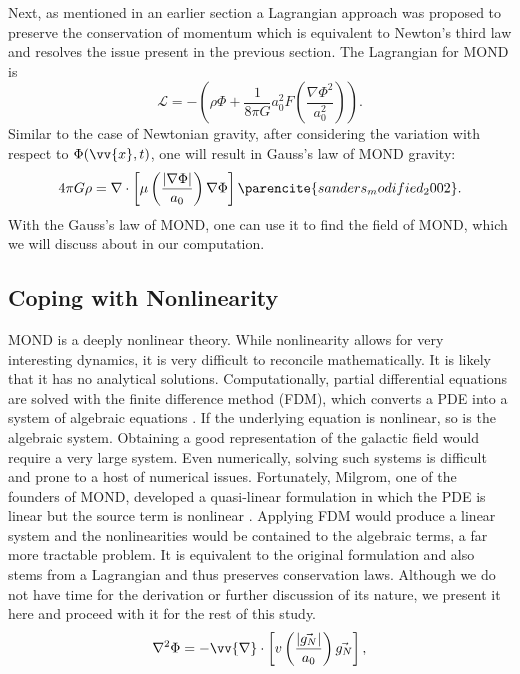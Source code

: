 \documentclass[11pt, twocolumn]{article}
\newcommand{\vx}{\vv{x}}
\newcommand{\ff}[2]{\frac{#1}{#2}}
\newcommand{\abs}[1]{| #1 |}
\renewcommand{\div}{\vv{\nabla} \cdot}
\begin{document}
    Next, as mentioned in an earlier section a Lagrangian approach was proposed to preserve the conservation of momentum which is equivalent to Newton's third law and resolves the issue present in the previous section. The Lagrangian for MOND is
    \begin{equation}
        \mathcal{L} = - \left(\rho \Phi + \ff{1}{8 \pi G}a_0^2F\left(\ff{\nabla \Phi^2}{a_0^2}\right)\right).
    \end{equation}
    Similar to the case of Newtonian gravity, after considering the variation with respect to \(\Phi(\vx, t)\), one will result in Gauss's law of MOND gravity:
    \begin{equation}
        4 \pi G \rho = \nabla \cdot \left[\mu \left(\ff{\abs{\nabla \Phi}}{a_0}\right)\nabla \Phi\right] \parencite{sanders_modified_2002}.
    \end{equation}
    With the Gauss's law of MOND, one can use it to find the field of MOND, which we will discuss about in our computation.



    \subsection*{Coping with Nonlinearity}
    MOND is a deeply nonlinear theory. While nonlinearity allows for very interesting dynamics, it is very difficult to reconcile mathematically. It is likely that it has no analytical solutions. Computationally, partial differential equations are solved with the finite difference method (FDM), which converts a PDE into a system of algebraic equations \parencite{sauer_numerical_2017}. If the underlying equation is nonlinear, so is the algebraic system. Obtaining a good representation of the galactic field would require a very large system. Even numerically, solving such systems is difficult and prone to a host of numerical issues. Fortunately, Milgrom, one of the founders of MOND, developed a quasi-linear formulation in which the PDE is linear but the source term is nonlinear \parencite{milgrom_quasi-linear_2010}. Applying FDM would produce a linear system and the nonlinearities would be contained to the algebraic terms, a far more tractable problem. It is equivalent to the original formulation and also stems from a Lagrangian and thus preserves conservation laws. Although we do not have time for the derivation or further discussion of its nature, we present it here and proceed with it for the rest of this study.
    \begin{equation} \nabla^2 \Phi = -\div \left[v\left(\frac{|\vec{g_N}|}{a_0}\right)\vec{g_N}\right], \end{equation}
\end{document}
